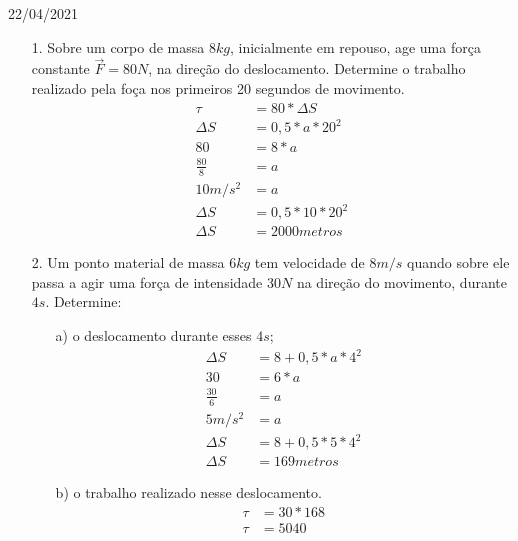 \documentclass{SchoolBook}
\begin{document}
    \begin{day}{22/04/2021}
        \begin{enumerate}
            \item[1.] Sobre um corpo de massa $ 8 kg $, inicialmente em repouso, age uma força constante $ \vec{F} = 80 N $, na direção do deslocamento.
            Determine o trabalho realizado pela foça nos primeiros 20 segundos de movimento.
            \begin{align*}
                        \tau &= 80 * \Delta S   \\ 
                    \Delta S &= 0,5 * a * 20^2  \\
                          80 &= 8 * a           \\
                \frac{80}{8} &= a               \\
                    10 m/s^2 &= a               \\
                    \Delta S &= 0,5 * 10 * 20^2 \\
                    \Delta S &= 2000 metros
            \end{align*}

            \item[2.] Um ponto material de massa $ 6 kg $ tem velocidade de $ 8 m/s $ quando sobre ele passa a agir uma força de intensidade $ 30 N $ na direção do movimento, durante $ 4 s $. Determine:
            \begin{enumerate}
                \item[a)] o deslocamento durante esses $ 4 s$;
                \begin{align*}
                        \Delta S &= 8 + 0,5 * a * 4^2 \\
                              30 &= 6 * a             \\
                    \frac{30}{6} &= a                 \\
                         5 m/s^2 &= a                 \\
                        \Delta S &= 8 + 0,5 * 5 * 4^2 \\
                        \Delta S &= 169 metros
                \end{align*}
                
                \item[b)] o trabalho realizado nesse deslocamento.
                \begin{align*}
                    \tau &= 30 * 168 \\
                    \tau &= 5040
                \end{align*}
            \end{enumerate}


\end{enumerate}
\end{day}
\end{document}

